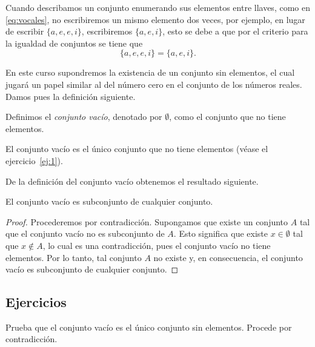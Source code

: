 \documentclass[12pt,a4paper]{book}
\begin{document}
    Cuando describamos un conjunto enumerando sus elementos entre llaves,
    como en \eqref{eq:vocales}, no escribiremos un mismo elemento dos veces, por ejemplo,
    en lugar de escribir $\{a,e,e,i\}$, escribiremos $\{a,e,i\}$, esto se debe a que por
    el criterio para la igualdad de conjuntos se tiene que
    \begin{equation*}
        \{a,e,e,i\}=\{a,e,i\}.
    \end{equation*}

    En este curso supondremos la existencia de un conjunto sin elementos, el
    cual jugará un papel similar al del número cero en el conjunto de los números
    reales. Damos pues la definición siguiente.

    \begin{definicion}\label{def:3}\label{def:vacio}
        Definimos el \textit{conjunto vacío}, denotado por
        $\emptyset$, como el conjunto que no tiene elementos.
    \end{definicion}

    El conjunto vacío es el único conjunto que no tiene elementos (véase el
    ejercicio~\ref{ej:1}).

    De la definición del conjunto vacío obtenemos el resultado siguiente.

    \begin{proposicion}\label{prop:1}
        El conjunto vacío es subconjunto de cualquier conjunto.
    \end{proposicion}

    \begin{proof}
        Procederemos por contradicción. Supongamos que existe un
        conjunto $A$ tal que el conjunto vacío no es subconjunto de $A$. Esto significa que
        existe $x\in\emptyset$ tal que $x\notin A$, lo cual es una contradicción, pues el conjunto vacío
        no tiene elementos. Por lo tanto, tal conjunto $A$ no existe y, en consecuencia,
        el conjunto vacío es subconjunto de cualquier conjunto.
    \end{proof}

    \par{}\subsection*{Ejercicios}

    \begin{ejercicio}\label{ej:1}
        Prueba que el conjunto vacío
        es el único conjunto sin elementos. \sugerencia Procede por contradicción.
    \end{ejercicio}
\end{document}
